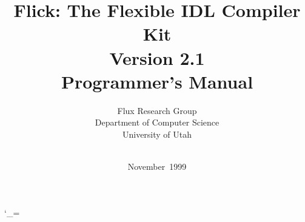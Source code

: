 

\usepackage{fullpage}
\usepackage{graphicx}
\usepackage[obeyspaces,spaces]{url}

\renewcommand{\rmdefault}{ptm}
\renewcommand{\sfdefault}{phv}
\renewcommand{\ttdefault}{cmtt}

\catcode`\_=\active



\title{Flick: The Flexible IDL Compiler Kit \\
       Version 2.1 \\[3ex]
       Programmer's Manual}

\author{Flux Research Group \\
        Department of Computer Science \\
        University of Utah \\[2ex]
        \fluxurl \\
        \flickemail}

\date{November~1999}

\makeatletter
\gdef\@copyrightnotice@begin{}
\gdef\@copyrightnotice@end{}
\gdef\@copyrightnotice{}
\def\copyrightnoticebegin#1{\gdef\@copyrightnotice@begin{#1}}
\def\copyrightnoticeend#1{\gdef\@copyrightnotice@end{#1}}
\def\copyrightnotice#1{\gdef\@copyrightnotice{#1}}
\makeatother


